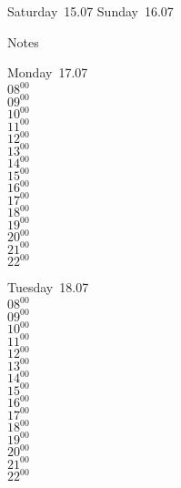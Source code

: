 \documentclass[11pt,a4paper]{book}\usepackage[]{graphicx}\usepackage[]{color}
\begin{document}
\begin{weekendbox}
  Saturday~15.07
  \tcblower
  Sunday~16.07
\end{weekendbox} %
\begin{notebox}
  Notes
\end{notebox}
\clearpage
\begin{headerbox}
\end{headerbox}
\begin{weekdaybox}
  Monday~17.07\\
  { 
  \vfill
  $08^{00}$\\
$09^{00}$\\
$10^{00}$\\
$11^{00}$\\
$12^{00}$\\
$13^{00}$\\
$14^{00}$\\
$15^{00}$\\
$16^{00}$\\
$17^{00}$\\
$18^{00}$\\
$19^{00}$\\
$20^{00}$\\
$21^{00}$\\
$22^{00}$\\
  }
\end{weekdaybox}
\begin{weekdaybox}
  Tuesday~18.07\\
  { 
  \vfill
  $08^{00}$\\
$09^{00}$\\
$10^{00}$\\
$11^{00}$\\
$12^{00}$\\
$13^{00}$\\
$14^{00}$\\
$15^{00}$\\
$16^{00}$\\
$17^{00}$\\
$18^{00}$\\
$19^{00}$\\
$20^{00}$\\
$21^{00}$\\
$22^{00}$\\
  }
\end{weekdaybox}
\end{document}
